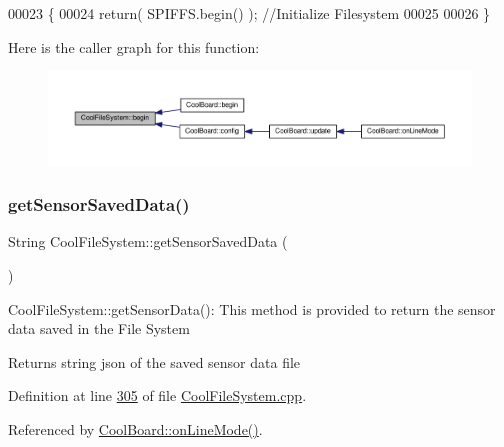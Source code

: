 \begin{DoxyCode}
00023 \{
00024     \textcolor{keywordflow}{return}( SPIFFS.begin() );                                   \textcolor{comment}{//Initialize Filesystem}
00025 
00026 \}
\end{DoxyCode}
Here is the caller graph for this function\+:\nopagebreak
\begin{figure}[H]
\begin{center}
\leavevmode
\includegraphics[width=350pt]{class_cool_file_system_a6ba6f666ed4c530174f8569d2c636748_icgraph}
\end{center}
\end{figure}
\mbox{\label{class_cool_file_system_a5c58bca3735c0ed3efb268d70ef998ef}} 
\subsubsection{\texorpdfstring{get\+Sensor\+Saved\+Data()}{getSensorSavedData()}}
{\footnotesize\ttfamily String Cool\+File\+System\+::get\+Sensor\+Saved\+Data (\begin{DoxyParamCaption}{ }\end{DoxyParamCaption})}

Cool\+File\+System\+::get\+Sensor\+Data()\+: This method is provided to return the sensor data saved in the File System

\begin{DoxyReturn}{Returns}
string json of the saved sensor data file 
\end{DoxyReturn}


Definition at line \hyperlink{_cool_file_system_8cpp_source_l00305}{305} of file \hyperlink{_cool_file_system_8cpp_source}{Cool\+File\+System.\+cpp}.



Referenced by \hyperlink{_cool_board_8cpp_source_l00097}{Cool\+Board\+::on\+Line\+Mode()}.


